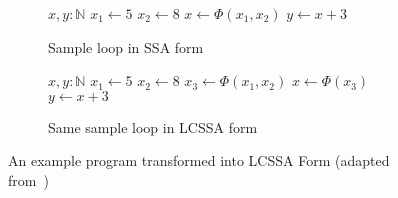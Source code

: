 \begin{figure}[h]
    \begin{subfigure}[b]{0.5\textwidth}
        \centering
        \begin{algorithmic}
            \State $x, y: \mathbb{N}$
            \Repeat
            \State $x_1 \gets 5$
            \Else
            \State $x_2 \gets 8$
            \EndIf
            \State $x \gets \Phi(x_1, x_2)$
            \State $y \gets x + 3$
            \EndFunction
        \end{algorithmic}
        \caption{Sample loop in SSA form}
    \end{subfigure}
    \begin{subfigure}[b]{0.5\textwidth}
        \centering
        \begin{algorithmic}
            \State $x, y: \mathbb{N}$
            \Repeat
            \State $x_1 \gets 5$
            \Else
            \State $x_2 \gets 8$
            \EndIf
            \State $x_3 \gets \Phi(x_1, x_2)$
            \State $x \gets \Phi(x_3)$
            \State $y \gets x + 3$
            \EndFunction
        \end{algorithmic}
        \caption{Same sample loop in LCSSA form}
    \end{subfigure}
    \caption{An example program transformed into LCSSA Form (adapted from~\cite{LLVM_LCSSA})}
    \label{fig:basics:LCSSA}
\end{figure}

